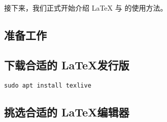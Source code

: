 接下来，我们正式开始介绍 {\LaTeX} 与 {\BIThesis} 的使用方法。

\subsection{准备工作}

\subsection{下载合适的 \LaTeX 发行版}
\begin{verbatim}
sudo apt install texlive
\end{verbatim}

\subsection{挑选合适的 \LaTeX 编辑器}
